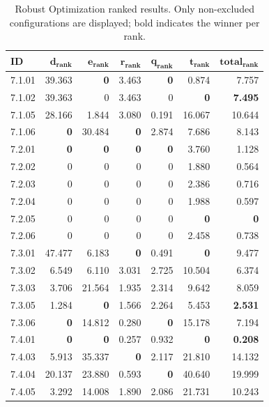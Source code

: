 \begin{table}[!t]
\centering
\footnotesize
\caption{Robust Optimization ranked results. Only non-excluded configurations are displayed; bold indicates the winner per rank.}
\label{tab:robust_ranked}
\begin{tabular}{@{}lrrrrrr@{}}
\hline
    \textbf{ID} & $\bm{d_{\text{rank}}}$ & $\bm{e_{\text{rank}}}$ & $\bm{r_{\text{rank}}}$ & $\bm{q_{\text{rank}}}$ & $\bm{t_{\text{rank}}}$ & $\bm{total_{\text{rank}}}$ \\
\hline
    7.1.01 & 39.363 & \textbf{0} & 3.463 & \textbf{0} & 0.874 & 7.757 \\
    7.1.02 & 39.363 & 0 & 3.463 & 0 & \textbf{0} & \textbf{7.495} \\
    7.1.05 & 28.166 & 1.844 & 3.080 & 0.191 & 16.067 & 10.644 \\
    7.1.06 & \textbf{0} & 30.484 & \textbf{0} & 2.874 & 7.686 & 8.143 \\
    \noalign{\smallskip}
    7.2.01 & \textbf{0} & \textbf{0} & \textbf{0} & \textbf{0} & 3.760 & 1.128 \\
    7.2.02 & 0 & 0 & 0 & 0 & 1.880 & 0.564 \\
    7.2.03 & 0 & 0 & 0 & 0 & 2.386 & 0.716 \\
    7.2.04 & 0 & 0 & 0 & 0 & 1.988 & 0.597 \\
    7.2.05 & 0 & 0 & 0 & 0 & \textbf{0} & \textbf{0} \\
    7.2.06 & 0 & 0 & 0 & 0 & 2.458 & 0.738 \\
    \noalign{\smallskip}
    7.3.01 & 47.477 & 6.183 & \textbf{0} & 0.491 & \textbf{0} & 9.477 \\
    7.3.02 & 6.549 & 6.110 & 3.031 & 2.725 & 10.504 & 6.374 \\
    7.3.03 & 3.706 & 21.564 & 1.935 & 2.314 & 9.642 & 8.059 \\
    7.3.05 & 1.284 & \textbf{0} & 1.566 & 2.264 & 5.453 & \textbf{2.531} \\
    7.3.06 & \textbf{0} & 14.812 & 0.280 & \textbf{0} & 15.178 & 7.194 \\
    \noalign{\smallskip}
    7.4.01 & \textbf{0} & \textbf{0} & 0.257 & 0.932 & \textbf{0} & \textbf{0.208} \\
    7.4.03 & 5.913 & 35.337 & \textbf{0} & 2.117 & 21.810 & 14.132 \\
    7.4.04 & 20.137 & 23.880 & 0.593 & \textbf{0} & 40.640 & 19.999 \\
    7.4.05 & 3.292 & 14.008 & 1.890 & 2.086 & 21.731 & 10.243 \\
\hline
\end{tabular}
\end{table}